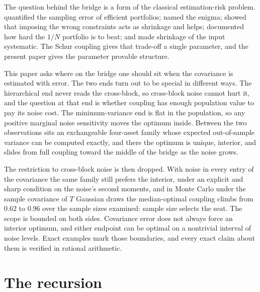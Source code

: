 \documentclass[11pt]{article}
\theoremstyle{remark}
\begin{document}
The question behind the bridge is a form of the classical estimation-risk
problem. \cite{jobson1980} quantified the sampling error of efficient
portfolios; \cite{michaud1989} named the enigma; \cite{jagannathanma2003}
showed that imposing the wrong constraints acts as shrinkage and helps;
\cite{demiguel2009} documented how hard the $1/N$ portfolio is to beat; and
\cite{ledoitwolf2004} made shrinkage of the input systematic. The Schur
coupling gives that trade-off a single parameter, and the present paper
gives the parameter provable structure.

This paper asks where on the bridge one should sit when the covariance is
estimated with error. The two ends turn out to be special in different
ways. The hierarchical end never reads the cross-block, so cross-block
noise cannot hurt it, and the question at that end is whether coupling has
enough population value to pay its noise cost. The minimum-variance end is
flat in the population, so any positive marginal noise sensitivity moves
the optimum inside. Between the two observations sits an exchangeable
four-asset family whose expected out-of-sample variance can be computed
exactly, and there the optimum is unique, interior, and slides from full
coupling toward the middle of the bridge as the noise grows.

The restriction to cross-block noise is then dropped. With noise in every
entry of the covariance the same family still prefers the interior, under
an explicit and sharp condition on the noise's second moments, and in
Monte Carlo under the sample covariance of $T$ Gaussian draws the
median-optimal coupling climbs from $0.62$ to $0.96$ over the sample
sizes examined: sample size selects the seat. The scope is
bounded on both sides. Covariance error does not always force
an interior optimum, and either endpoint can be optimal on a nontrivial
interval of noise levels. Exact examples mark those boundaries, and every
exact claim about them is verified in rational arithmetic.

\section{The recursion}
\label{sec:setup}
\end{document}
